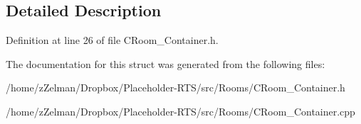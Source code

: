 \subsection{Detailed Description}


Definition at line 26 of file C\-Room\-\_\-\-Container.\-h.



The documentation for this struct was generated from the following files\-:\begin{DoxyCompactItemize}
\item 
/home/z\-Zelman/\-Dropbox/\-Placeholder-\/\-R\-T\-S/src/\-Rooms/C\-Room\-\_\-\-Container.\-h\item 
/home/z\-Zelman/\-Dropbox/\-Placeholder-\/\-R\-T\-S/src/\-Rooms/C\-Room\-\_\-\-Container.\-cpp\end{DoxyCompactItemize}
